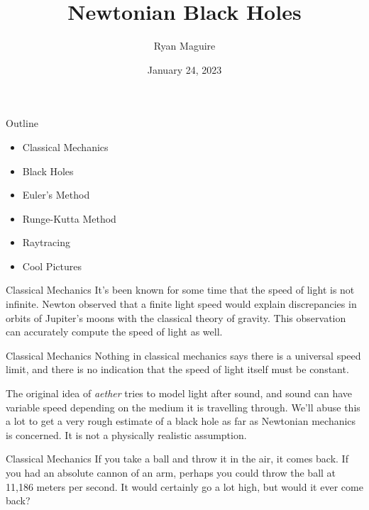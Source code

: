 \documentclass{beamer}
\title{Newtonian Black Holes}
\author{Ryan Maguire}
\date{January 24, 2023}
\begin{document}
    \maketitle
    \begin{frame}{Outline}
        \begin{itemize}
            \item Classical Mechanics
            \item Black Holes
            \item Euler's Method
            \item Runge-Kutta Method
            \item Raytracing
            \item Cool Pictures
        \end{itemize}
    \end{frame}
    \begin{frame}{Classical Mechanics}
        It's been known for some time that the speed of light is not infinite.
        Newton observed that a finite light speed would explain discrepancies
        in orbits of Jupiter's moons with the classical theory of gravity.
        This observation can accurately compute the speed of light as well.
    \end{frame}
    \begin{frame}{Classical Mechanics}
        Nothing in classical mechanics says there is a universal speed limit,
        and there is no indication that the speed of light itself must be
        constant.
        \par\hfill\par
        The original idea of \textit{aether} tries to model light after sound,
        and sound can have variable speed depending on the medium it is
        travelling through. We'll abuse this a lot to get a very rough
        estimate of a black hole as far as Newtonian mechanics is concerned.
        It is not a physically realistic assumption.
    \end{frame}
    \begin{frame}{Classical Mechanics}
        If you take a ball and throw it in the air, it comes back. If you had
        an absolute cannon of an arm, perhaps you could throw the ball at
        11,186 meters per second. It would certainly go a lot high, but would
        it ever come back?
    \end{frame}
\end{document}
